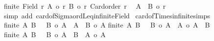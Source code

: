 \begin{isabellebody}
{\isachardoublequoteopen}{\isasymlbrakk}{\isasymnot}finite\ {\isacharparenleft}{\kern0pt}Field\ r{\isacharparenright}{\kern0pt}{\isacharsemicolon}{\kern0pt}\ {\isacharbar}{\kern0pt}A{\isacharbar}{\kern0pt}\ {\isasymle}o\ r{\isacharsemicolon}{\kern0pt}\ {\isacharbar}{\kern0pt}B{\isacharbar}{\kern0pt}\ {\isasymle}o\ r{\isacharsemicolon}{\kern0pt}\ Card{\isacharunderscore}{\kern0pt}order\ r{\isasymrbrakk}\isanewline
\ {\isasymLongrightarrow}\ {\isacharbar}{\kern0pt}A\ {\isasymtimes}\ B{\isacharbar}{\kern0pt}\ {\isasymle}o\ r{\isachardoublequoteclose}\isanewline
%
\isadelimproof
%
\endisadelimproof
%
\isatagproof
{}\isamarkupfalse%
{\isacharparenleft}{\kern0pt}simp\ add{\isacharcolon}{\kern0pt}\ card{\isacharunderscore}{\kern0pt}of{\isacharunderscore}{\kern0pt}Sigma{\isacharunderscore}{\kern0pt}ordLeq{\isacharunderscore}{\kern0pt}infinite{\isacharunderscore}{\kern0pt}Field{\isacharparenright}{\kern0pt}%
\endisatagproof
{\isafoldproof}%
%
\isadelimproof
\isanewline
%
\endisadelimproof
\isanewline
{}\isamarkupfalse%
\ card{\isacharunderscore}{\kern0pt}of{\isacharunderscore}{\kern0pt}Times{\isacharunderscore}{\kern0pt}infinite{\isacharunderscore}{\kern0pt}simps{\isacharcolon}{\kern0pt}\isanewline
{\isachardoublequoteopen}{\isasymlbrakk}{\isasymnot}finite\ A{\isacharsemicolon}{\kern0pt}\ B\ {\isasymnoteq}\ {\isacharbraceleft}{\kern0pt}{\isacharbraceright}{\kern0pt}{\isacharsemicolon}{\kern0pt}\ {\isacharbar}{\kern0pt}B{\isacharbar}{\kern0pt}\ {\isasymle}o\ {\isacharbar}{\kern0pt}A{\isacharbar}{\kern0pt}{\isasymrbrakk}\ {\isasymLongrightarrow}\ {\isacharbar}{\kern0pt}A\ {\isasymtimes}\ B{\isacharbar}{\kern0pt}\ {\isacharequal}{\kern0pt}o\ {\isacharbar}{\kern0pt}A{\isacharbar}{\kern0pt}{\isachardoublequoteclose}\isanewline
{\isachardoublequoteopen}{\isasymlbrakk}{\isasymnot}finite\ A{\isacharsemicolon}{\kern0pt}\ B\ {\isasymnoteq}\ {\isacharbraceleft}{\kern0pt}{\isacharbraceright}{\kern0pt}{\isacharsemicolon}{\kern0pt}\ {\isacharbar}{\kern0pt}B{\isacharbar}{\kern0pt}\ {\isasymle}o\ {\isacharbar}{\kern0pt}A{\isacharbar}{\kern0pt}{\isasymrbrakk}\ {\isasymLongrightarrow}\ {\isacharbar}{\kern0pt}A{\isacharbar}{\kern0pt}\ {\isacharequal}{\kern0pt}o\ {\isacharbar}{\kern0pt}A\ {\isasymtimes}\ B{\isacharbar}{\kern0pt}{\isachardoublequoteclose}\isanewline
{\isachardoublequoteopen}{\isasymlbrakk}{\isasymnot}finite\ A{\isacharsemicolon}{\kern0pt}\ B\ {\isasymnoteq}\ {\isacharbraceleft}{\kern0pt}{\isacharbraceright}{\kern0pt}{\isacharsemicolon}{\kern0pt}\ {\isacharbar}{\kern0pt}B{\isacharbar}{\kern0pt}\ {\isasymle}o\ {\isacharbar}{\kern0pt}A{\isacharbar}{\kern0pt}{\isasymrbrakk}\ {\isasymLongrightarrow}\ {\isacharbar}{\kern0pt}B\ {\isasymtimes}\ A{\isacharbar}{\kern0pt}\ {\isacharequal}{\kern0pt}o\ {\isacharbar}{\kern0pt}A{\isacharbar}{\kern0pt}{\isachardoublequoteclose}\isanewline

\end{isabellebody}
